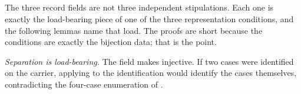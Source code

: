 \documentclass[11pt]{article}
\begin{document}
\begin{code}
\AgdaSpace{}%
\AgdaSymbol{=}\AgdaSpace{}%
\AgdaSpace{}%
\<%
\\
%
\>[2]\AgdaSymbol{;}\AgdaSpace{}%
%
\>[27]\AgdaSymbol{=}\AgdaSpace{}%
\AgdaSpace{}%
\AgdaBound{\AgdaUnderscore{}}\AgdaSpace{}%
\AgdaBound{\AgdaUnderscore{}}\AgdaSpace{}%
\AgdaSpace{}%
\<%
\\
%
\>[2]\AgdaSymbol{;}\AgdaSpace{}%
%
\>[27]\AgdaSymbol{=}\AgdaSpace{}%
\<%
\\
%
\>[2]\AgdaSymbol{\}}\<%
\\
%
\>[2]\<%
\\
\>[2][@{}l@{\AgdaIndent{0}}]%
\>[4]\AgdaSpace{}%
\AgdaSymbol{=}\AgdaSpace{}%
\AgdaSpace{}%
\<%
\\
%
\\[\AgdaEmptyExtraSkip]%
\>[0]\<%
\\
\>[0]\AgdaSpace{}%
\AgdaSymbol{:}\AgdaSpace{}%
\<%
\\
\>[0]\AgdaSpace{}%
\AgdaSymbol{=}\AgdaSpace{}%
\AgdaSpace{}%
\<%
\end{code}

The three record fields are not three independent stipulations.  Each
one is exactly the load-bearing piece of one of the three
representation conditions, and the following lemmas name that load.
The proofs are short because the conditions are exactly the bijection
data; that is the point.

\emph{Separation is load-bearing.}  The field
 makes  injective.
If two cases were identified on the carrier, applying
 to the identification would identify the cases
themselves, contradicting the four-case enumeration of
.
\end{document}
